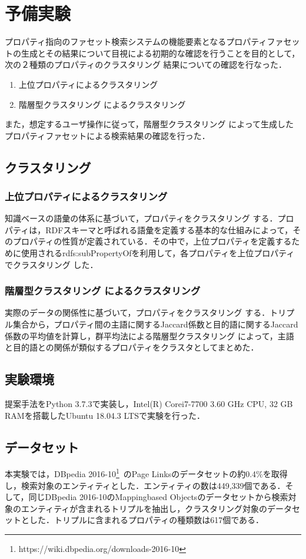 \section{予備実験}
\label{sec:experiments}
プロパティ指向のファセット検索システムの機能要素となるプロパティファセットの生成とその結果について目視による初期的な確認を行うことを目的として，次の２種類のプロパティのクラスタリング 結果についての確認を行なった．
\begin{enumerate}
	\item 上位プロパティによるクラスタリング
	\item 階層型クラスタリング によるクラスタリング
\end{enumerate}
また，想定するユーザ操作に従って，階層型クラスタリング によって生成したプロパティファセットによる検索結果の確認を行った．
%
\subsection{クラスタリング }
\subsubsection{上位プロパティによるクラスタリング }
知識ベースの語彙の体系に基づいて，プロパティをクラスタリング する．プロパティは，RDFスキーマと呼ばれる語彙を定義する基本的な仕組みによって，そのプロパティの性質が定義されている．その中で，上位プロパティを定義するために使用されるrdfs:subPropertyOfを利用して，各プロパティを上位プロパティでクラスタリング した．
\subsubsection{階層型クラスタリング によるクラスタリング }
実際のデータの関係性に基づいて，プロパティをクラスタリング する．トリプル集合から，プロパティ間の主語に関するJaccard係数と目的語に関するJaccard係数の平均値を計算し，群平均法による階層型クラスタリング によって，主語と目的語との関係が類似するプロパティをクラスタとしてまとめた．
%
\subsection{実験環境}
\label{sec:environment}
提案手法をPython 3.7.3で実装し，Intel(R) Core\texttrademark i7-7700 3.60 GHz CPU, 32 GB RAMを搭載したUbuntu 18.04.3 LTSで実験を行った．
%
\subsection{データセット}
\label{sec:datasets}
本実験では，DBpedia 2016-10\footnote{https://wiki.dbpedia.org/downloads-2016-10}\ のPage Linksのデータセットの約0.4\%を取得し，検索対象のエンティティとした．エンティティの数は449,339個である．そして，同じDBpedia 2016-10のMappingbased Objectsのデータセットから検索対象のエンティティが含まれるトリプルを抽出し，クラスタリング対象のデータセットとした．トリプルに含まれるプロパティの種類数は617個である．
%
